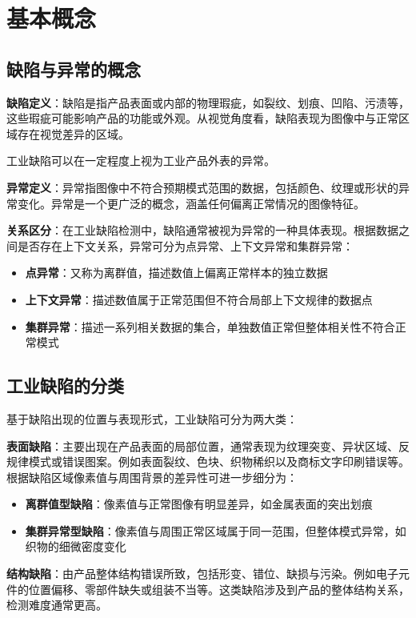 \documentclass[
  ]{njuthesis}
\begin{document}
\section{基本概念}

\subsection{缺陷与异常的概念}

\textbf{缺陷定义}：缺陷是指产品表面或内部的物理瑕疵，如裂纹、划痕、凹陷、污渍等，这些瑕疵可能影响产品的功能或外观。从视觉角度看，缺陷表现为图像中与正常区域存在视觉差异的区域。

工业缺陷可以在一定程度上视为工业产品外表的异常。

\textbf{异常定义}：异常指图像中不符合预期模式范围的数据，包括颜色、纹理或形状的异常变化。异常是一个更广泛的概念，涵盖任何偏离正常情况的图像特征。

\textbf{关系区分}：在工业缺陷检测中，缺陷通常被视为异常的一种具体表现。根据数据之间是否存在上下文关系，异常可分为点异常、上下文异常和集群异常：
\begin{itemize}
    \item \textbf{点异常}：又称为离群值，描述数值上偏离正常样本的独立数据
    \item \textbf{上下文异常}：描述数值属于正常范围但不符合局部上下文规律的数据点
    \item \textbf{集群异常}：描述一系列相关数据的集合，单独数值正常但整体相关性不符合正常模式
\end{itemize}

\subsection{工业缺陷的分类}

基于缺陷出现的位置与表现形式，工业缺陷可分为两大类：

\textbf{表面缺陷}：主要出现在产品表面的局部位置，通常表现为纹理突变、异状区域、反规律模式或错误图案。例如表面裂纹、色块、织物稀织以及商标文字印刷错误等。根据缺陷区域像素值与周围背景的差异性可进一步细分为：
\begin{itemize}
    \item \textbf{离群值型缺陷}：像素值与正常图像有明显差异，如金属表面的突出划痕
    \item \textbf{集群异常型缺陷}：像素值与周围正常区域属于同一范围，但整体模式异常，如织物的细微密度变化
\end{itemize}

\textbf{结构缺陷}：由产品整体结构错误所致，包括形变、错位、缺损与污染。例如电子元件的位置偏移、零部件缺失或组装不当等。这类缺陷涉及到产品的整体结构关系，检测难度通常更高。
\end{document}
